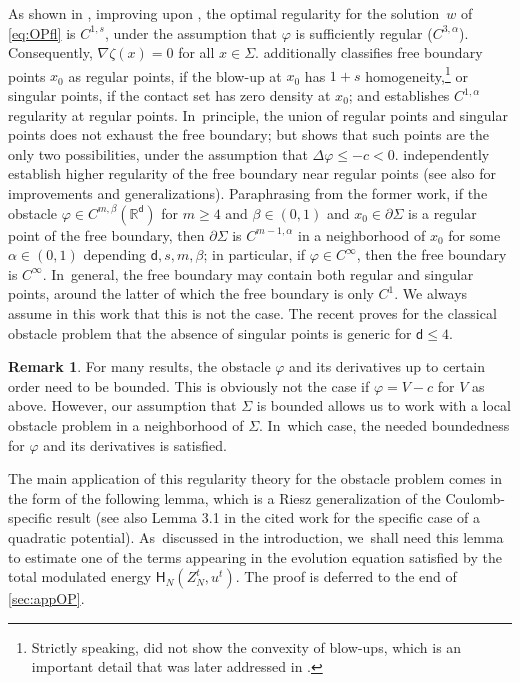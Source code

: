 \documentclass[10pt]{amsart}
\theoremstyle{plain}
\theoremstyle{definition}
\newtheorem{remark}[thm]{Remark}
\newcommand{\R}{{\mathbb{R}}}
\let\al\alpha
\let\be\beta
\let\D\Delta
\let\p\partial
\newcommand{\Hr}{\mathsf{H}}
\renewcommand{\d}{\mathsf{d}}
\begin{document}
As shown in \cite{CSS2008}, improving upon \cite{Silvestre2007}, the optimal regularity for the solution~$w$ of \eqref{eq:OPfl} is $C^{1,s}$, under the assumption that $\varphi$ is sufficiently regular (\eg $C^{3,\al}$). Consequently, $\nabla\zeta(x) = 0$ for all $x\in\Sigma$. \cite{CSS2008} additionally classifies free boundary points $x_0$ as regular points, if the blow-up at $x_0$ has $1+s$ homogeneity,\footnote{{Strictly speaking, \cite{CSS2008} did not show the convexity of blow-ups, which is an important detail that was later addressed in \cite{fRJ2021, CDV2022}.}} or singular points, if the contact set has zero density at $x_0$; and establishes $C^{1,\al}$ regularity at regular points. In~principle, the union of regular points and singular points does not exhaust the free boundary; but \cite{BFRo2018} shows that such points are the only two possibilities, under the assumption that $\D\varphi\leq -c< 0$. \cite{JN2017, KRS2019} independently establish higher regularity of the free boundary near regular points {(see also \cite{ArO2020} for improvements and generalizations)}. Paraphrasing from the former work, if the obstacle $\varphi\in C^{m,\be}(\R^\d)$ for $m\geq 4$ and $\be\in (0,1)$ and $x_0\in \p\Sigma$ is a regular point of the free boundary, then $\p\Sigma$ is $C^{m-1,\al}$ in a neighborhood of $x_0$ for some $\al\in (0,1)$ depending $\d,s,m,\be$; in particular, if $\varphi\in C^\infty$, then the free boundary is $C^\infty$. In~general, the free boundary may contain both regular and singular points, around the latter of which the free boundary is only $C^1$. We always assume in this work that this is not the case. The recent \cite{FRoS2020} proves for the classical obstacle problem that the absence of singular points is generic for $\d\leq 4$.

\begin{remark}
For many results, the obstacle $\varphi$ and its derivatives up to certain order need to be bounded. This is obviously not the case if $\varphi = V-c$ for $V$ as above. However, our assumption that $\Sigma$ is bounded allows us to work with a local obstacle problem in a neighborhood of $\Sigma$. In~which case, the needed boundedness for $\varphi$ and its derivatives is satisfied.
\end{remark}

The main application of this regularity theory for the obstacle problem comes in the form of the following lemma, which is a Riesz generalization of the Coulomb-specific result \cite[Lem.\,3.2]{BCGM2015} (see also Lemma 3.1 in the cited work for the specific case of a quadratic potential). As~discussed in the introduction, we~shall need this lemma to estimate one of the terms appearing in the evolution equation satisfied by the total modulated energy $\Hr_N(Z_N^t,u^t)$. {The proof is deferred to the end of \cref{sec:appOP}.}
\end{document}
